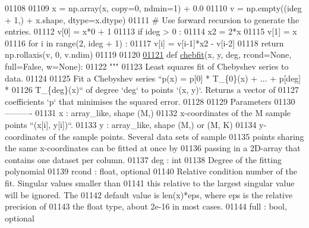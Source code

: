 \begin{DoxyCode}
01108 
01109     x = np.array(x, copy=0, ndmin=1) + 0.0
01110     v = np.empty((ideg + 1,) + x.shape, dtype=x.dtype)
01111     \textcolor{comment}{# Use forward recursion to generate the entries.}
01112     v[0] = x*0 + 1
01113     \textcolor{keywordflow}{if} ideg > 0 :
01114         x2 = 2*x
01115         v[1] = x
01116         \textcolor{keywordflow}{for} i \textcolor{keywordflow}{in} range(2, ideg + 1) :
01117             v[i] = v[i-1]*x2 - v[i-2]
01118     \textcolor{keywordflow}{return} np.rollaxis(v, 0, v.ndim)
01119 
01120 
\hypertarget{chebyshev_8py_source_l01121}{}\hyperlink{namespacepyneb_1_1utils_1_1chebyshev_a6bb5eb95525fd0572aea52fcd2a12c6c}{01121} \textcolor{keyword}{def }\hyperlink{namespacepyneb_1_1utils_1_1chebyshev_a6bb5eb95525fd0572aea52fcd2a12c6c}{chebfit}(x, y, deg, rcond=None, full=False, w=None):
01122     \textcolor{stringliteral}{"""}
01123 \textcolor{stringliteral}{    Least squares fit of Chebyshev series to data.}
01124 \textcolor{stringliteral}{}
01125 \textcolor{stringliteral}{    Fit a Chebyshev series ``p(x) = p[0] * T\_\{0\}(x) + ... + p[deg] *}
01126 \textcolor{stringliteral}{    T\_\{deg\}(x)`` of degree `deg` to points `(x, y)`. Returns a vector of}
01127 \textcolor{stringliteral}{    coefficients `p` that minimises the squared error.}
01128 \textcolor{stringliteral}{}
01129 \textcolor{stringliteral}{    Parameters}
01130 \textcolor{stringliteral}{    ----------}
01131 \textcolor{stringliteral}{    x : array\_like, shape (M,)}
01132 \textcolor{stringliteral}{        x-coordinates of the M sample points ``(x[i], y[i])``.}
01133 \textcolor{stringliteral}{    y : array\_like, shape (M,) or (M, K)}
01134 \textcolor{stringliteral}{        y-coordinates of the sample points. Several data sets of sample}
01135 \textcolor{stringliteral}{        points sharing the same x-coordinates can be fitted at once by}
01136 \textcolor{stringliteral}{        passing in a 2D-array that contains one dataset per column.}
01137 \textcolor{stringliteral}{    deg : int}
01138 \textcolor{stringliteral}{        Degree of the fitting polynomial}
01139 \textcolor{stringliteral}{    rcond : float, optional}
01140 \textcolor{stringliteral}{        Relative condition number of the fit. Singular values smaller than}
01141 \textcolor{stringliteral}{        this relative to the largest singular value will be ignored. The}
01142 \textcolor{stringliteral}{        default value is len(x)*eps, where eps is the relative precision of}
01143 \textcolor{stringliteral}{        the float type, about 2e-16 in most cases.}
01144 \textcolor{stringliteral}{    full : bool, optional}

\end{DoxyCode}
